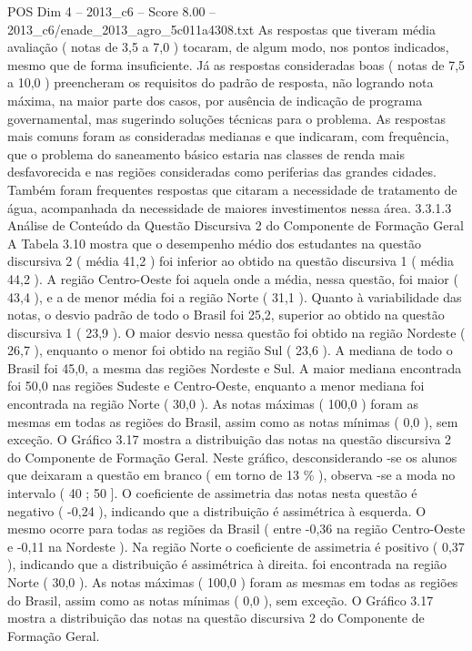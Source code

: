 \begin{textsample}{POS Dim 4 – 2013\_c6 – Score 8.00 – 2013\_c6/enade\_2013\_agro\_5c011a4308.txt}
As respostas que tiveram média avaliação ( notas de 3,5 a 7,0 ) tocaram, de algum modo, nos pontos indicados, mesmo que de forma insuficiente.
Já as respostas consideradas boas ( notas de 7,5 a 10,0 ) preencheram os requisitos do padrão de resposta, não logrando nota máxima, na maior parte dos casos, por ausência de indicação de programa governamental, mas sugerindo soluções técnicas para o problema.
As respostas mais comuns foram as consideradas medianas e que indicaram, com frequência, que o problema do saneamento básico estaria nas classes de renda mais desfavorecida e nas regiões consideradas como periferias das grandes cidades.
Também foram frequentes respostas que citaram a necessidade de tratamento de água, acompanhada da necessidade de maiores investimentos nessa área. 3.3.1.3 Análise de Conteúdo da Questão Discursiva 2 do Componente de Formação Geral A Tabela 3.10 mostra que o desempenho médio dos estudantes na questão discursiva 2 ( média 41,2 ) foi inferior ao obtido na questão discursiva 1 ( média 44,2 ).
A região Centro-Oeste foi aquela onde a média, nessa questão, foi maior ( 43,4 ), e a de menor média foi a região Norte ( 31,1 ).
Quanto à variabilidade das notas, o desvio padrão de todo o Brasil foi 25,2, superior ao obtido na questão discursiva 1 ( 23,9 ).
O maior desvio nessa questão foi obtido na região Nordeste ( 26,7 ), enquanto o menor foi obtido na região Sul ( 23,6 ).
A mediana de todo o Brasil foi 45,0, a mesma das regiões Nordeste e Sul.
A maior mediana encontrada foi 50,0 nas regiões Sudeste e Centro-Oeste, enquanto a menor mediana foi encontrada na região Norte ( 30,0 ).
As notas máximas ( 100,0 ) foram as mesmas em todas as regiões do Brasil, assim como as notas mínimas ( 0,0 ), sem exceção.
O Gráfico 3.17 mostra a distribuição das notas na questão discursiva 2 do Componente de Formação Geral.
Neste gráfico, desconsiderando -se os alunos que deixaram a questão em branco ( em torno de 13 \% ), observa -se a moda no intervalo ( 40 ; 50 ].
O coeficiente de assimetria das notas nesta questão é negativo ( -0,24 ), indicando que a distribuição é assimétrica à esquerda.
O mesmo ocorre para todas as regiões da Brasil ( entre -0,36 na região Centro-Oeste e -0,11 na Nordeste ).
Na região Norte o coeficiente de assimetria é positivo ( 0,37 ), indicando que a distribuição é assimétrica à direita. foi encontrada na região Norte ( 30,0 ).
As notas máximas ( 100,0 ) foram as mesmas em todas as regiões do Brasil, assim como as notas mínimas ( 0,0 ), sem exceção.
O Gráfico 3.17 mostra a distribuição das notas na questão discursiva 2 do Componente de Formação Geral.

\end{textsample}
